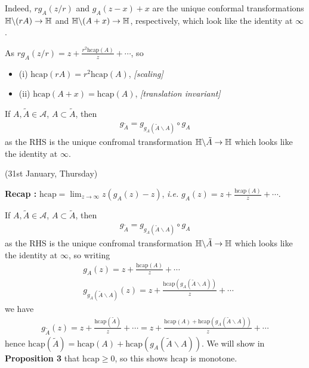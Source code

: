 \documentclass[12pt,a4paper]{article}
\renewenvironment{i}
{\begin{itemize} 
	}%
	{\end{itemize}
}
\begin{document}
\quad Indeed, $rg_A(z/r)$ and $g_A(z-x) + x$ are the unique conformal transformations $\mathbb{H} \backslash (rA) \rightarrow \mathbb{H}$ and $\mathbb{H} \backslash (A+x) \rightarrow \mathbb{H}$, respectively, which look like the identity at $\infty$.

\quad As $rg_A(z/r) = z+ \frac{r^2 \text{hcap}(A)}{z} + \cdots$, so
\begin{i}
\item[(i)] $\text{hcap}(rA) = r^2 \text{hcap}(A)$, \emph{[scaling]}
\item[(ii)] $\text{hcap}(A+x) = \text{hcap}(A)$, \emph{[translation invariant]}
\end{i}
If $A, \tilde{A} \in \mathscr{A}$, $A\subset \tilde{A}$, then 
\begin{align*}
g_{\tilde{A}} = g_{g_A(\tilde{A} \backslash A)} \circ g_A
\end{align*}
as the RHS is the unique confromal transformation $\mathbb{H} \backslash \tilde{A} \rightarrow \mathbb{H}$ which looks like the identity at $\infty$.
\s

\newday

(31st January, Thursday)
\s

\textbf{Recap :} $\text{hcap} = \lim_{z\rightarrow \infty} z(g_A(z)-z)$, \textit{i.e.} $g_A(z) = z+ \frac{\text{hcap}(A)}{z} + \cdots$.
\s

If $A, \tilde{A} \in \mathscr{A}$, $A\subset \tilde{A}$, then 
\begin{align*}
g_{\tilde{A}} = g_{g_A(\tilde{A} \backslash A)} \circ g_A
\end{align*}
as the RHS is the unique confromal transformation $\mathbb{H} \backslash \tilde{A} \rightarrow \mathbb{H}$ which looks like the identity at $\infty$, so writing
\begin{align*}
& g_A(z) = z+ \frac{\text{hcap}(A)}{z} + \cdots \\
& g_{g_A(\tilde{A} \backslash A)} (z) = z + \frac{\text{hcap}(g_A(\tilde{A} \backslash A))}{z}+\cdots
\end{align*}
we have
\begin{align*}
g_{\tilde{A}}(z) = z+ \frac{\text{hcap}(\tilde{A})}{z} + \cdots = z+ \frac{\text{hcap}(A) + \text{hcap}(g_A(\tilde{A} \backslash A))}{z} + \cdots
\end{align*}
hence $\text{hcap}(\tilde{A}) = \text{hcap}(A) + \text{hcap}(g_A(\tilde{A}\backslash A))$. We will show in \textbf{Proposition 3} that $\text{hcap}\geq 0$, so this shows $\text{hcap}$ is monotone.
\s
\end{document}
